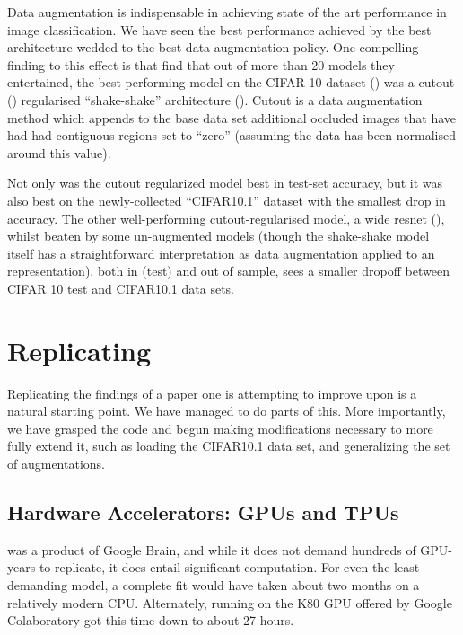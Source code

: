 \documentclass[10pt,twocolumn,letterpaper]{article}
\begin{document}
	Data augmentation is indispensable in achieving state of the art performance in image classification. We have seen the best performance achieved by the best architecture wedded to the best data augmentation policy.  One compelling finding to this effect is that \cite{Recht2018} find that out of more than 20 models they entertained, the best-performing model on the CIFAR-10 dataset (\cite{Krizhevsk2009}) was a cutout (\cite{Devries2017}) regularised ``shake-shake'' architecture (\cite{Gastaldi2017}). Cutout is a data augmentation method which appends to the base data set additional occluded images that have had had contiguous regions set to ``zero'' (assuming the data has been normalised around this value). 

	Not only was the cutout regularized model best in test-set accuracy, but it was also best on the newly-collected ``CIFAR10.1'' dataset with the smallest drop in accuracy. The other well-performing cutout-regularised model, a wide resnet (\cite{Zagoruyko2016}), whilst beaten by some un-augmented models (though the shake-shake model itself has a straightforward interpretation as data augmentation applied to an representation), both in (test) and out of sample, sees a smaller dropoff between CIFAR 10 test and CIFAR10.1 data sets. 

\section{Replicating \cite{Cubuk2018}}
	Replicating the findings of a paper one is attempting to improve upon is a natural starting point. We have managed to do parts of this. More importantly, we have grasped the code and begun making modifications necessary to more fully extend it, such as loading the CIFAR10.1 data set, and generalizing the set of augmentations.

	\subsection{Hardware Accelerators: GPUs and TPUs}
		\cite{Cubuk2018} was a product of Google Brain, and while it does not demand hundreds of GPU-years to replicate, it does entail significant computation. For even the least-demanding model, a complete fit would have taken about two months on a relatively modern CPU. Alternately, running on the K80 GPU offered by Google Colaboratory got this time down to about 27 hours. 
\end{document}
